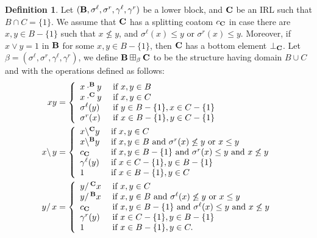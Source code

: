 \documentclass{amsart}
\theoremstyle{definition}
\newtheorem{definition}[theorem]{Definition}
\numberwithin{equation}{section}
\newcommand{\alg}[1]{{\textbf{\upshape #1}}}  %
\newcommand{\back}{\backslash}
\newcommand{\sell}{\sigma^\ell}
\newcommand{\sr}{\sigma^r}
\newcommand{\gell}{\gamma^\ell}
\newcommand{\gr}{\gamma^r}
\begin{document}
	\begin{definition}
		Let $(\alg B, \sell, \sr, \gell, \gr)$ be a lower block, and $\alg C$ be an IRL such that $B \cap C = \{1\}$. We assume that $\alg C$ has a splitting coatom $c_{\alg C}$ in case there are $x,y \in B - \{1\}$ such that $x \not\leq y$, and $\sell(x) \leq y$ or $\sr(x) \leq y$. Moreover, if $x \lor y = 1$ in $\alg B$ for some $x, y \in B - \{1\}$, then $\alg C$ has a bottom element $\perp_{\alg C}$. 
		Let $\beta = (\sell, \sr, \gell, \gr)$, we define $\alg B \boxplus_\beta \alg C$ to be the structure having domain $	B \cup C$ and with the operations
		defined as follows:
		\begin{align*}
x y &=\left\{\begin{array}{ll}
x \cdot^{\alg B} y &\mbox{ if } x, y \in B\\
x \cdot^{\alg C} y &\mbox{ if } x, y \in C\\
\sell (y) & \mbox{ if } y \in B - \{1\}, x \in C - \{1\}\\
\sr(x) & \mbox{ if } x \in B - \{1\}, y \in C - \{1\}\end{array}\right.\\
x\back\, y &=\left\{\begin{array}{ll} 
x \back^{\alg C} y  &\mbox{ if } x, y \in C\\
x \back^{\alg B} y &\mbox{ if } x, y \in B\mbox{ and } \sr(x)\not \leq y \mbox { or } x \leq y\\
c_{\alg C} & \mbox{ if } x, y \in  B-\{1\} \mbox { and } \sr(x)\leq y \mbox { and } x \not \leq y\\ 
\gell(y) & \mbox{ if } x \in C - \{1\}, y \in B - \{1\} \\
1 & \mbox{ if } x \in B - \{1\}, y \in C\\ \end{array}\right.\\
y/\, x &=\left\{\begin{array}{ll} 
y/\,^{\alg C} x  &\mbox{ if } x, y \in C\\
y/\,^{\alg B} x &\mbox{ if } x, y \in B\mbox{ and } \sell(x)\not \leq y \mbox{ or } x \leq y\\
c_{\alg C}& \mbox{ if } x, y \in  B -\{1\} \mbox{ and } \sell(x) \leq y \mbox{ and } x \not \leq y\\
\gr(y) & \mbox{ if } x \in C - \{1\}, y \in B - \{1\} \\
1 & \mbox{ if } x \in B - \{1\}, y \in C.\\\end{array}\right.\\

\end{align*}
\end{definition}
\end{document}
